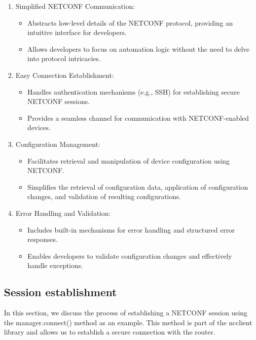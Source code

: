 \begin{enumerate}
    \item Simplified NETCONF Communication:
    \begin{itemize}
      \item Abstracts low-level details of the NETCONF protocol, providing an intuitive interface for developers.
      \item Allows developers to focus on automation logic without the need to delve into protocol intricacies.
    \end{itemize}
    
    \item Easy Connection Establishment:
    \begin{itemize}
      \item Handles authentication mechanisms (e.g., SSH) for establishing secure NETCONF sessions.
      \item Provides a seamless channel for communication with NETCONF-enabled devices.
    \end{itemize}
    
    \item Configuration Management:
    \begin{itemize}
      \item Facilitates retrieval and manipulation of device configuration using NETCONF.
      \item Simplifies the retrieval of configuration data, application of configuration changes, and validation of resulting configurations.
    \end{itemize}
    
    \item Error Handling and Validation:
    \begin{itemize}
      \item Includes built-in mechanisms for error handling and structured error responses.
      \item Enables developers to validate configuration changes and effectively handle exceptions.
    \end{itemize}

\end{enumerate}

\subsection{Session establishment}

In this section, we discuss the process of establishing a NETCONF session using the manager.connect() method as an example. This method is part of the ncclient library and allows us to establish a secure connection with the router.

